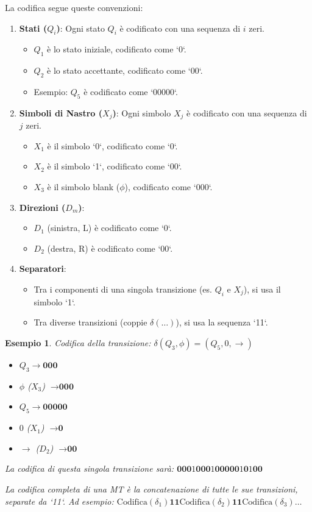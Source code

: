 \documentclass[a4paper]{article}
\newtheorem{example}{Esempio}
\begin{document}
La codifica segue queste convenzioni:
\begin{enumerate}
    \item \textbf{Stati ($Q_i$)}: Ogni stato $Q_i$ è codificato con una sequenza di $i$ zeri.
    \begin{itemize}
        \item $Q_1$ è lo stato iniziale, codificato come `0`.
        \item $Q_2$ è lo stato accettante, codificato come `00`.
        \item Esempio: $Q_5$ è codificato come `00000`.
    \end{itemize}
    \item \textbf{Simboli di Nastro ($X_j$)}: Ogni simbolo $X_j$ è codificato con una sequenza di $j$ zeri.
    \begin{itemize}
        \item $X_1$ è il simbolo `0`, codificato come `0`.
        \item $X_2$ è il simbolo `1`, codificato come `00`.
        \item $X_3$ è il simbolo blank ($\phi$), codificato come `000`.
    \end{itemize}
    \item \textbf{Direzioni ($D_m$)}:
    \begin{itemize}
        \item $D_1$ (sinistra, L) è codificato come `0`.
        \item $D_2$ (destra, R) è codificato come `00`.
    \end{itemize}
    \item \textbf{Separatori}:
    \begin{itemize}
        \item Tra i componenti di una singola transizione (es. $Q_i$ e $X_j$), si usa il simbolo `1`.
        \item Tra diverse transizioni (coppie $\delta(\dots)$), si usa la sequenza `11`.
    \end{itemize}
\end{enumerate}

\begin{example}
Codifica della transizione: $\delta(Q_3, \phi) = (Q_5, 0, \rightarrow)$
\begin{itemize}
    \item $Q_3 \rightarrow \textbf{000}$
    \item $\phi$ ($X_3$) $\rightarrow \textbf{000}$
    \item $Q_5 \rightarrow \textbf{00000}$
    \item $0$ ($X_1$) $\rightarrow \textbf{0}$
    \item $\rightarrow$ ($D_2$) $\rightarrow \textbf{00}$
\end{itemize}
La codifica di questa singola transizione sarà:
$\textbf{000} \text{1} \textbf{000} \text{1} \textbf{00000} \text{1} \textbf{0} \text{1} \textbf{00}$

La codifica completa di una MT è la concatenazione di tutte le sue transizioni, separate da `11`. Ad esempio:
$\text{Codifica}(\delta_1) \textbf{11} \text{Codifica}(\delta_2) \textbf{11} \text{Codifica}(\delta_3) \dots$
\end{example}
\end{document}
